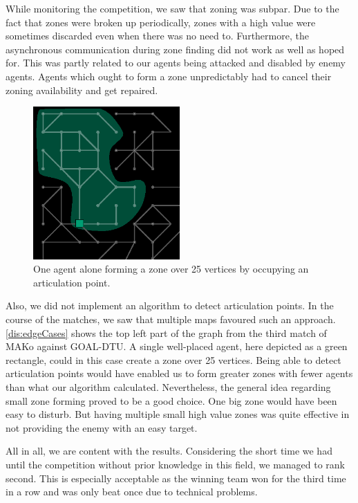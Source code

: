 While monitoring the competition, we saw that zoning was subpar.
Due to the fact that zones were broken up periodically, zones with a high value were sometimes discarded even when there was no need to.
Furthermore, the asynchronous communication during zone finding did not work as well as hoped for.
This was partly related to our agents being attacked and disabled by enemy agents.
Agents which ought to form a zone unpredictably had to cancel their zoning availability and get repaired.
\begin{figure}[h]
	\centering
	\includegraphics[width=0.5\textwidth]{images/resultsEdgeCase.eps}
	\caption{One agent alone forming a zone over 25 vertices by occupying an articulation point.}
	\label{dis:edgeCases}
\end{figure}
Also, we did not implement an algorithm to detect articulation points.
In the course of the matches, we saw that multiple maps favoured such an approach.
\autoref{dis:edgeCases} shows the top left part of the graph from the third match of MAKo against GOAL-DTU.
A single well-placed agent, here depicted as a green rectangle, could in this case create a zone over 25 vertices.
Being able to detect articulation points would have enabled us to form greater zones with fewer agents than what our algorithm calculated.
Nevertheless, the general idea regarding small zone forming proved to be a good choice.
One big zone would have been easy to disturb.
But having multiple small high value zones was quite effective in not providing the enemy with an easy target.

All in all, we are content with the results.
Considering the short time we had until the competition without prior knowledge in this field, we managed to rank second.
This is especially acceptable as the winning team won for the third time in a row and was only beat once due to technical problems.
